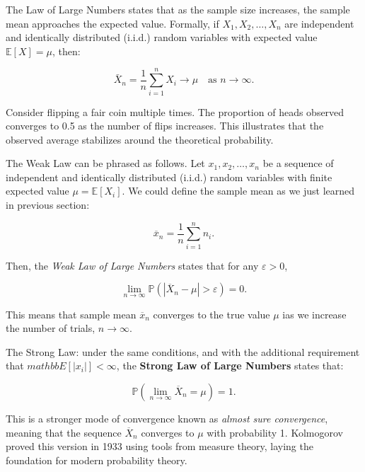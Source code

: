 \documentclass{book}
\begin{document}
The Law of Large Numbers states that as the sample size increases, the sample mean approaches the expected value. Formally, if $X_1, X_2, \dots, X_n$ are independent and identically distributed (i.i.d.) random variables with expected value $\mathbb{E}[X] = \mu$, then:

\begin{equation}
    \bar{X}_n = \frac{1}{n} \sum_{i=1}^{n} X_i \to \mu \quad \text{as } n \to \infty.
\end{equation}

Consider flipping a fair coin multiple times. The proportion of heads observed converges to 0.5 as the number of flips increases. This illustrates that the observed average stabilizes around the theoretical probability.

\medskip

The Weak Law can be phrased as follows. Let $x_1, x_2, \dots, x_n$ be a sequence of independent and identically distributed (i.i.d.) random variables with finite expected value $\mu = \mathbb{E}[X_i]$. We could define the sample mean as we just learned in previous section:

\begin{equation}
	\overline{x}_n = \frac{1}{n} \sum_{i=1}^n n_i.
\end{equation}

Then, the \textit{Weak Law of Large Numbers} states that for any $\varepsilon > 0$,

\begin{equation}
	\lim_{n \to \infty} \mathbb{P}\left( \left| \overline{X}_n - \mu \right| > \varepsilon \right) = 0.
\end{equation}

This means that sample mean $\overline{x}_n$ converges to the true value $\mu$ ias we increase the number of trials, $n \to \infty$.

\medskip

The Strong Law: under the same conditions, and with the additional requirement that $mathbb{E}[|x_i|] < \infty$, the \textbf{Strong Law of Large Numbers} states that:

\begin{equation}
	\mathbb{P}\left( \lim_{n \to \infty} \overline{X}_n = \mu \right) = 1.
\end{equation}

This is a stronger mode of convergence known as \emph{almost sure convergence}, meaning that the sequence \( \overline{X}_n \) converges to \( \mu \) with probability 1. Kolmogorov proved this version in 1933 using tools from measure theory, laying the foundation for modern probability theory.
\end{document}
